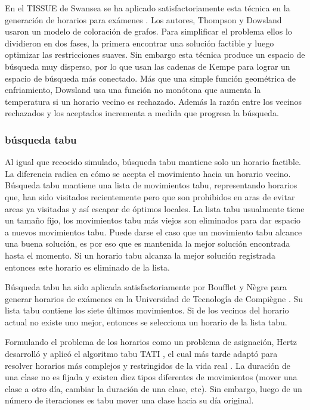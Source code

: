 En el TISSUE de Swansea se ha aplicado satisfactoriamente esta t\'ecnica en la generación de horarios para exámenes
\cite{J Thompson and KA Dowsland, J Thompson and KA Dowsland 2}. Los autores, Thompson y Dowsland usaron un modelo de coloración de grafos. Para simplificar el problema ellos lo dividieron en dos fases, la primera encontrar una solución factible y luego optimizar las restricciones suaves. Sin embargo esta t\'ecnica produce un espacio de búsqueda muy disperso, por lo que usan las cadenas de Kempe para lograr un espacio de búsqueda más conectado. Más que una simple función geom\'etrica de enfriamiento, Dowsland usa una función no monótona que aumenta la temperatura si un horario vecino es rechazado. Además la razón entre los vecinos rechazados y los aceptados incrementa a medida que progresa la búsqueda.

\subsubsection{búsqueda tabu}

Al igual que recocido simulado, búsqueda tabu mantiene solo un horario factible. La diferencia radica en cómo se acepta el movimiento hacia un horario vecino. Búsqueda tabu mantiene una lista de movimientos tabu, representando horarios que, han sido visitados recientemente pero que son prohibidos en aras de evitar areas ya visitadas y así escapar de óptimos locales. La lista tabu usualmente tiene un tamaño fijo, los movimientos tabu más viejos son eliminados para dar espacio a nuevos movimientos tabu. Puede darse el caso que un movimiento tabu alcance una buena solución, es por eso que es mantenida la mejor solución encontrada hasta el momento. Si un horario tabu alcanza la mejor solución registrada entonces este horario es eliminado de la lista.

Búsqueda tabu ha sido aplicada satisfactoriamente por Boufflet y N\`egre para generar horarios de exámenes en la Universidad de Tecnología de Compi\`egne \cite{JP Boufflet and S Negre}. Su lista tabu contiene los siete últimos movimientos. Si de los vecinos del horario actual no existe uno mejor, entonces se selecciona un horario de la lista tabu.

Formulando el problema de los horarios como un problema de asignación, Hertz desarrolló y aplicó el algoritmo tabu TATI \cite{A Hertz}, el cual más tarde adaptó para resolver horarios más complejos y restringidos de la vida real \cite{A Hertz 2}. La duración de una clase no es fijada y existen diez tipos diferentes de movimientos (mover una clase a otro día, cambiar la duración de una clase, etc). Sin embargo, luego de un número de iteraciones es tabu mover una clase hacia su día original.

